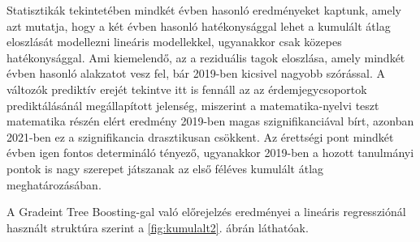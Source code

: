 \documentclass[12pt]{article}
\begin{document}
\noindent Statisztikák tekintetében mindkét évben hasonló eredményeket kaptunk, amely azt mutatja, hogy a két évben hasonló hatékonysággal lehet a kumulált átlag eloszlását modellezni lineáris modellekkel, ugyanakkor csak közepes hatékonysággal. Ami kiemelendő, az a reziduális tagok eloszlása, amely mindkét évben hasonló alakzatot vesz fel, bár 2019-ben kicsivel nagyobb szórással. A változók prediktív erejét tekintve itt is fennáll az az érdemjegycsoportok prediktálásánál megállapított jelenség, miszerint a matematika-nyelvi teszt matematika részén elért eredmény 2019-ben magas szignifikanciával bírt, azonban 2021-ben ez a szignifikancia drasztikusan csökkent. Az érettségi pont mindkét évben igen fontos determináló tényező, ugyanakkor 2019-ben a hozott tanulmányi pontok is nagy szerepet játszanak az első féléves kumulált átlag meghatározásában.

A Gradeint Tree Boosting-gal való előrejelzés eredményei a lineáris regressziónál használt struktúra szerint a \ref{fig:kumulalt2}. ábrán láthatóak. 
\end{document}
